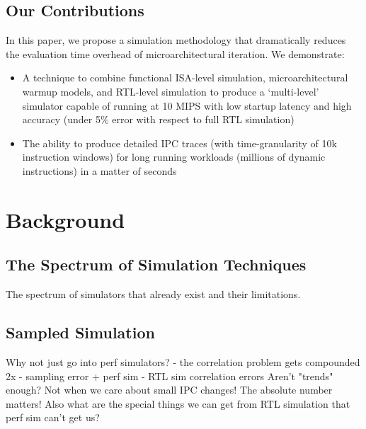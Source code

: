 \documentclass[sigplan,nonacm,10pt]{acmart}
\begin{document}
\subsection{Our Contributions}

In this paper, we propose a simulation methodology that dramatically reduces the evaluation time overhead of microarchitectural iteration.
We demonstrate:

\begin{itemize}
  \item A technique to combine functional ISA-level simulation, microarchitectural warmup models, and RTL-level simulation to produce a `multi-level' simulator capable of running at 10 MIPS with low startup latency and high accuracy (under 5\% error with respect to full RTL simulation)
  \item The ability to produce detailed IPC traces (with time-granularity of 10k instruction windows) for long running workloads (millions of dynamic instructions) in a matter of seconds
\end{itemize}

\section{Background}



\subsection{The Spectrum of Simulation Techniques}
The spectrum of simulators that already exist and their limitations.



\subsection{Sampled Simulation}

Why not just go into perf simulators? - the correlation problem gets compounded 2x - sampling error + perf sim - RTL sim correlation errors
Aren't "trends" enough? Not when we care about small IPC changes! The absolute number matters! Also what are the special things we can get from RTL simulation that perf sim can't get us?
\end{document}

